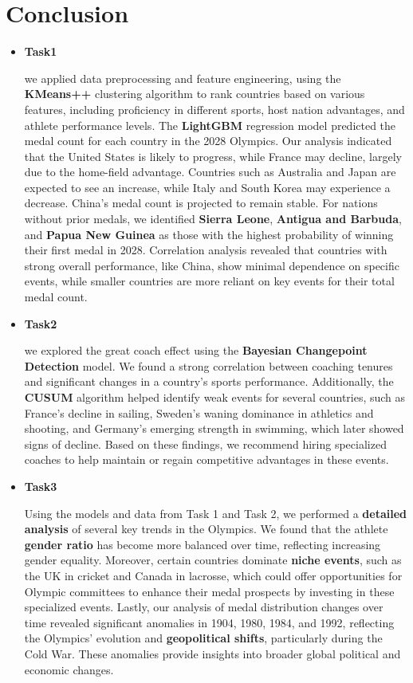 \documentclass[12pt]{article}  %
\begin{document}
\section{Conclusion}
\begin{itemize}
		\item \textbf{Task1}
		

 we applied data preprocessing and feature engineering, using the \textbf{KMeans++} clustering algorithm to rank countries based on various features, including proficiency in different sports, host nation advantages, and athlete performance levels. The \textbf{LightGBM} regression model predicted the medal count for each country in the 2028 Olympics. Our analysis indicated that the United States is likely to progress, while France may decline, largely due to the home-field advantage. Countries such as Australia and Japan are expected to see an increase, while Italy and South Korea may experience a decrease. China's medal count is projected to remain stable. For nations without prior medals, we identified \textbf{Sierra Leone}, \textbf{Antigua and Barbuda}, and \textbf{Papua New Guinea} as those with the highest probability of winning their first medal in 2028. Correlation analysis revealed that countries with strong overall performance, like China, show minimal dependence on specific events, while smaller countries are more reliant on key events for their total medal count.
	

	\item \textbf{Task2}
	
	
 we explored the great coach effect using the \textbf{Bayesian Changepoint Detection} model. We found a strong correlation between coaching tenures and significant changes in a country’s sports performance. Additionally, the \textbf{CUSUM} algorithm helped identify weak events for several countries, such as France’s decline in sailing, Sweden’s waning dominance in athletics and shooting, and Germany’s emerging strength in swimming, which later showed signs of decline. Based on these findings, we recommend hiring specialized coaches to help maintain or regain competitive advantages in these events.
	\item \textbf{Task3}
	
	
 Using the models and data from Task 1 and Task 2, we performed a \textbf{detailed analysis} of several key trends in the Olympics. We found that the athlete \textbf{gender ratio} has become more balanced over time, reflecting increasing gender equality. Moreover, certain countries dominate \textbf{niche events}, such as the UK in cricket and Canada in lacrosse, which could offer opportunities for Olympic committees to enhance their medal prospects by investing in these specialized events. Lastly, our analysis of medal distribution changes over time revealed significant anomalies in 1904, 1980, 1984, and 1992, reflecting the Olympics' evolution and \textbf{geopolitical shifts}, particularly during the Cold War. These anomalies provide insights into broader global political and economic changes.
\end{itemize}
\end{document}
